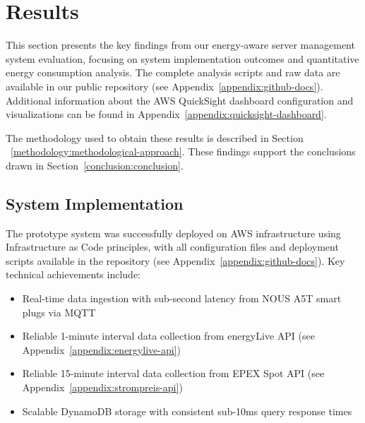 

\section{Results}
\label{results:results}
This section presents the key findings from our energy-aware server management system evaluation, 
focusing on system implementation outcomes and quantitative energy consumption analysis. 
The complete analysis scripts and raw data are available in our public repository 
(see Appendix~\ref{appendix:github-docs}).
Additional information about the AWS QuickSight dashboard configuration and visualizations can be found in Appendix~\ref{appendix:quicksight-dashboard}.

The methodology used to obtain these results is described in Section ~\ref{methodology:methodological-approach}.
These findings support the conclusions drawn in Section~\ref{conclusion:conclusion}.

\subsection{System Implementation}
\label{results:system-implementation}
The prototype system was successfully deployed on AWS infrastructure using Infrastructure as Code 
principles, with all configuration files and deployment scripts available in the repository 
(see Appendix~\ref{appendix:github-docs}). Key technical achievements include:

\begin{itemize}[noitemsep,topsep=0pt]
    \item Real-time data ingestion with sub-second latency from NOUS A5T smart plugs via MQTT
    \item Reliable 1-minute interval data collection from energyLive API (see Appendix~\ref{appendix:energylive-api}) 
    \item Reliable 15-minute interval data collection from EPEX Spot API (see Appendix~\ref{appendix:strompreis-api})

    \item Scalable DynamoDB storage with consistent sub-10ms query response times
\end{itemize}

